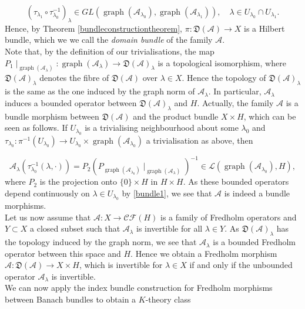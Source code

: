 \documentclass[a4paper,10pt]{article}
\DeclareMathOperator{\gra}{graph}
\begin{document}
\[(\tau_{\lambda_1}\circ\tau^{-1}_{\lambda_0})_\lambda\in GL(\gra(\mathcal{A}_{\lambda_0}),\gra(\mathcal{A}_{\lambda_1})),\quad \lambda\in U_{\lambda_0}\cap U_{\lambda_1}.\]
Hence, by Theorem \ref{bundleconstructiontheorem}, $\pi:\mathfrak{D}(\mathcal{A})\rightarrow X$ is a Hilbert bundle, which we we call the \textit{domain bundle} of the family $\mathcal{A}$.\\
Note that, by the definition of our trivialisations, the map $P_1\mid_{\gra(\mathcal{A}_\lambda)}:\gra(\mathcal{A}_\lambda)\rightarrow\mathfrak{D}(\mathcal{A})_\lambda$ is a topological isomorphism, where $\mathfrak{D}(\mathcal{A})_\lambda$ denotes the fibre of $\mathfrak{D}(\mathcal{A})$ over $\lambda\in X$. Hence the topology of $\mathfrak{D}(\mathcal{A})_\lambda$ is the same as the one induced by the graph norm of $\mathcal{A}_\lambda$. In particular, $\mathcal{A}_\lambda$ induces a bounded operator between $\mathfrak{D}(\mathcal{A})_\lambda$ and $H$. Actually, the family $\mathcal{A}$ is a bundle morphism between $\mathfrak{D}(\mathcal{A})$ and the product bundle $X\times H$, which can be seen as follows. If $U_{\lambda_0}$ is a trivialising neighbourhood about some $\lambda_0$ and $\tau_{\lambda_0}:\pi^{-1}(U_{\lambda_0})\rightarrow U_{\lambda_0}\times \gra(\mathcal{A}_{\lambda_0})$ a trivialisation as above, then

\[\mathcal{A}_\lambda(\tau^{-1}_{\lambda_0}(\lambda,\cdot))=P_2(P_{\gra(\mathcal{A}_{\lambda_0})}\mid_{\gra(\mathcal{A}_\lambda)})^{-1}\in\mathcal{L}(\gra(\mathcal{A}_{\lambda_0}),H),\]  
where $P_2$ is the projection onto $\{0\}\times H$ in $H\times H$. As these bounded operators depend continuously on $\lambda\in U_{\lambda_0}$ by \eqref{bundle1}, we see that $\mathcal{A}$ is indeed a bundle morphisms.\\
Let us now assume that $\mathcal{A}:X\rightarrow\mathcal{CF}(H)$ is a family of Fredholm operators and $Y\subset X$ a closed subset such that $\mathcal{A}_\lambda$ is invertible for all $\lambda\in Y$. As $\mathfrak{D}(\mathcal{A})_\lambda$ has the topology induced by the graph norm, we see that $\mathcal{A}_\lambda$ is a bounded Fredholm operator between this space and $H$. Hence we obtain a Fredholm morphism $\mathcal{A}:\mathfrak{D}(\mathcal{A})\rightarrow X\times H$, which is invertible for $\lambda\in X$ if and only if the unbounded operator $\mathcal{A}_\lambda$ is invertible.\\
We can now apply the index bundle construction for Fredholm morphisms between Banach bundles to obtain a $K$-theory class
\end{document}
